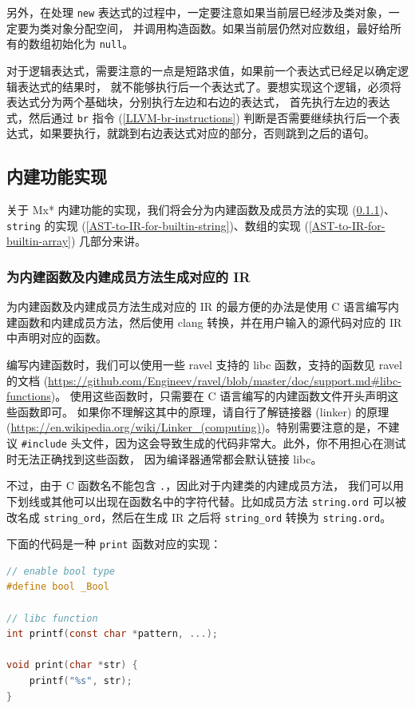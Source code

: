 另外，在处理 \texttt{new} 表达式的过程中，一定要注意如果当前层已经涉及类对象，一定要为类对象分配空间，
并调用构造函数。如果当前层仍然对应数组，最好给所有的数组初始化为
\texttt{null}。

对于逻辑表达式，需要注意的一点是短路求值，如果前一个表达式已经足以确定逻辑表达式的结果时，
就不能够执行后一个表达式了。要想实现这个逻辑，必须将表达式分为两个基础块，分别执行左边和右边的表达式，
首先执行左边的表达式，然后通过 \texttt{br} 指令 (\ref{LLVM-br-instructions})
判断是否需要继续执行后一个表达式，如果要执行，就跳到右边表达式对应的部分，否则跳到之后的语句。

\subsection{内建功能实现}\label{AST-to-IR-for-builtin}

关于 Mx* 内建功能的实现，我们将会分为内建函数及成员方法的实现
(\ref{AST-to-IR-for-builtin-func})、\texttt{string} 的实现
(\ref{AST-to-IR-for-builtin-string})、数组的实现
(\ref{AST-to-IR-for-builtin-array}) 几部分来讲。

\subsubsection{为内建函数及内建成员方法生成对应的 IR}\label{AST-to-IR-for-builtin-func}

为内建函数及内建成员方法生成对应的 IR 的最方便的办法是使用 C
语言编写内建函数和内建成员方法，然后使用 clang 转换，并在用户输入的源代码对应的 IR 中声明对应的函数。

编写内建函数时，我们可以使用一些 ravel 支持的 libc 函数，支持的函数见 ravel 的文档
(\url{https://github.com/Engineev/ravel/blob/master/doc/support.md#libc-functions})。
使用这些函数时，只需要在 C 语言编写的内建函数文件开头声明这些函数即可。
如果你不理解这其中的原理，请自行了解链接器 (linker) 的原理
(\url{https://en.wikipedia.org/wiki/Linker_(computing)})。特别需要注意的是，不建议
\texttt{\#include} 头文件，因为这会导致生成的代码非常大。此外，你不用担心在测试时无法正确找到这些函数，
因为编译器通常都会默认链接 libc。

不过，由于 C 函数名不能包含 \texttt{.}，因此对于内建类的内建成员方法，
我们可以用下划线或其他可以出现在函数名中的字符代替。比如成员方法 \texttt{string.ord}
可以被改名成 \texttt{string\_ord}，然后在生成 IR 之后将
\texttt{string\_ord} 转换为 \texttt{string.ord}。

下面的代码是一种 \texttt{print} 函数对应的实现：
\begin{lstlisting}[language=C]
// enable bool type
#define bool _Bool

// libc function
int printf(const char *pattern, ...);

void print(char *str) {
    printf("%s", str);
}
\end{lstlisting}

